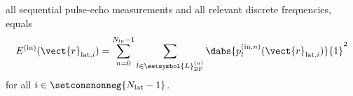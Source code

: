 all sequential pulse-echo measurements and
all relevant discrete frequencies, equals
\begin{equation}
  E^{(\text{in})}( \vect{r}_{\text{lat}, i} )
  =
  \sum_{ n = 0 }^{ N_{\text{in}} - 1 }
  \sum_{ l \in \setsymbol{L}_{ \text{BP} }^{(n)} }
    \dabs{ p_{l}^{(\text{in}, n)}( \vect{r}_{\text{lat}, i} ) }{1}^{2}
 \label{eqn:recovery_p_in_energy}
\end{equation}
for
all $i \in \setconsnonneg{ N_{\text{lat}} - 1 }$.
